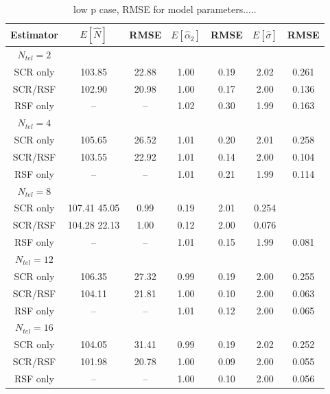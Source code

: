 \documentclass[12pt]{article}
\begin{document}
\begin{table}
\centering
\caption{low p case, RMSE for model parameters.....}
\begin{tabular}{ccccccc}
\hline
Estimator & $E[\hat{N}]$ & RMSE & $E[\hat{\alpha}_{2}]$ & RMSE &
$E[\hat{\sigma}]$ & RMSE \\ 
\hline \hline 
$N_{tel} = 2$ &      &      &       &      &    &      \\
SCR only     &103.85& 22.88&   1.00& 0.19& 2.02& 0.261 \\
SCR/RSF      &102.90& 20.98&   1.00& 0.17& 2.00& 0.136\\
RSF only     &--    & --   &  1.02 & 0.30& 1.99& 0.163\\
$N_{tel}=4$   &      &      &       &     &     &        \\
SCR only     &105.65& 26.52&   1.01& 0.20& 2.01& 0.258 \\
SCR/RSF      &103.55& 22.92&   1.01& 0.14& 2.00& 0.104\\
RSF only     & --   & --   &  1.01 & 0.21& 1.99& 0.114\\
$N_{tel}=8$   &      &      &       &     &     &       \\
SCR only     &107.41  45.05&   0.99& 0.19& 2.01& 0.254 \\
SCR/RSF      &104.28  22.13&   1.00& 0.12& 2.00& 0.076\\
RSF only     &--    & --    &  1.01& 0.15& 1.99& 0.081\\
$N_{tel}=12$  &      &       &      &     &      &      \\
SCR only     &106.35&  27.32& 0.99& 0.19 & 2.00& 0.255\\
SCR/RSF      &104.11&  21.81& 1.00& 0.10 & 2.00& 0.063\\
RSF only     & --   &  --   & 1.01& 0.12 & 2.00& 0.065\\
$N_{tel}=16$  &      &       &     &      &     &       \\
SCR only     &104.05&  31.41& 0.99& 0.19 & 2.02& 0.252\\
SCR/RSF      &101.98&  20.78& 1.00& 0.09 & 2.00& 0.055\\
RSF only     & --   &  --   & 1.00& 0.10 & 2.00& 0.056\\
\end{tabular}
\label{tab.lowp}
\end{table}
\end{document}
